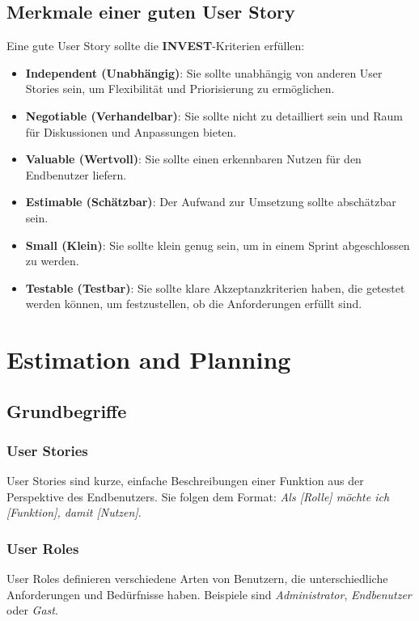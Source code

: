 \subsection{Merkmale einer guten User Story}

Eine gute User Story sollte die \textbf{INVEST}-Kriterien erfüllen:

\begin{itemize}
    \item \textbf{Independent (Unabhängig)}: Sie sollte unabhängig von anderen User Stories sein, um Flexibilität und Priorisierung zu ermöglichen.
    \item \textbf{Negotiable (Verhandelbar)}: Sie sollte nicht zu detailliert sein und Raum für Diskussionen und Anpassungen bieten.
    \item \textbf{Valuable (Wertvoll)}: Sie sollte einen erkennbaren Nutzen für den Endbenutzer liefern.
    \item \textbf{Estimable (Schätzbar)}: Der Aufwand zur Umsetzung sollte abschätzbar sein.
    \item \textbf{Small (Klein)}: Sie sollte klein genug sein, um in einem Sprint abgeschlossen zu werden.
    \item \textbf{Testable (Testbar)}: Sie sollte klare Akzeptanzkriterien haben, die getestet werden können, um festzustellen, ob die Anforderungen erfüllt sind.
\end{itemize}

\section{Estimation and Planning}

\subsection{Grundbegriffe}

\subsubsection{User Stories}
User Stories sind kurze, einfache Beschreibungen einer Funktion aus der Perspektive des Endbenutzers. Sie folgen dem Format: \textit{Als [Rolle] möchte ich [Funktion], damit [Nutzen]}.

\subsubsection{User Roles}
User Roles definieren verschiedene Arten von Benutzern, die unterschiedliche Anforderungen und Bedürfnisse haben. Beispiele sind \textit{Administrator}, \textit{Endbenutzer} oder \textit{Gast}.

